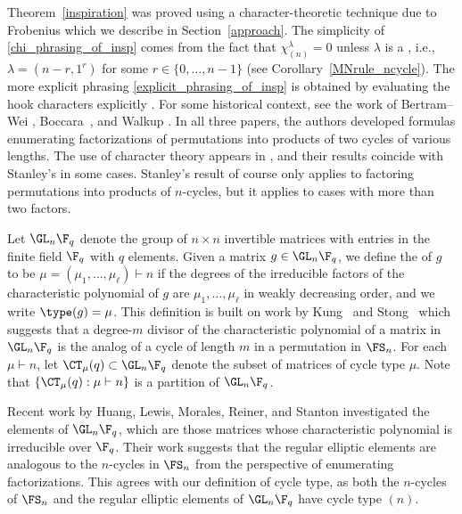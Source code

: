 Theorem~\ref{inspiration} was proved using a character-theoretic technique due to Frobenius which we describe in Section~\ref{approach}.
The simplicity of \eqref{chi_phrasing_of_insp} comes from the fact that \(\chi^\lambda_{(n)} = 0\) unless \(\lambda\) is a , i.e., \(\lambda = (n-r,1^r)\) for some \(r \in \{0,\ldots,n-1\}\) (see Corollary~\ref{MNrule_ncycle}).
The more explicit phrasing \eqref{explicit_phrasing_of_insp} is obtained by evaluating the hook characters explicitly \cite[Lemma~2.2]{ncycle}.
For some historical context, see the work of Bertram--Wei \cite{bertram_wei}, Boccara~\cite{boccara}, and Walkup \cite{walkup}.
In all three papers, the authors developed formulas enumerating factorizations of permutations into products of two cycles of various lengths.
The use of character theory appears in \cite[{Section~3}]{bertram_wei}, and their results coincide with Stanley's in some cases.
Stanley's result of course only applies to factoring permutations into products of \(n\)-cycles, but it applies to cases with more than two factors.

Let \(\GL_n \F_q\) denote the group of \(n \times n\) invertible matrices with entries in the finite field \(\F_q\) with \(q\) elements.
Given a matrix \(g \in \GL_n \F_q\), we define the  of \(g\) to be \(\mu = (\mu_1,\ldots,\mu_\ell) \vdash n\) if the degrees of the irreducible factors of the characteristic polynomial of \(g\) are \(\mu_1,\ldots,\mu_\ell\) in weakly decreasing order, and we write \(\type (g) = \mu\).
This definition is built on work by Kung~\cite{kung} and Stong~\cite{stong} which suggests that a degree-\(m\) divisor of the characteristic polynomial of a matrix in \(\GL_n \F_q\) is the analog of a cycle of length \(m\) in a permutation in \(\FS_n\).
For each \(\mu \vdash n\), let \(\CT_\mu (q) \subset \GL_n \F_q\) denote the subset of matrices of cycle type \(\mu\).
Note that \(\{\CT_\mu (q) : \mu \vdash n\}\) is a partition of \(\GL_n \F_q\).

Recent work by Huang, Lewis, Morales, Reiner, and Stanton \cite{HLR, LM, refl_fact} investigated the  elements of \(\GL_n \F_q\), which are those matrices whose characteristic polynomial is irreducible over \(\F_q\).
Their work suggests that the regular elliptic elements are analogous to the \(n\)-cycles in \(\FS_n\) from the perspective of enumerating factorizations.
This agrees with our definition of cycle type, as both the \(n\)-cycles of \(\FS_n\) and the regular elliptic elements of \(\GL_n \F_q\) have cycle type \((n)\).







